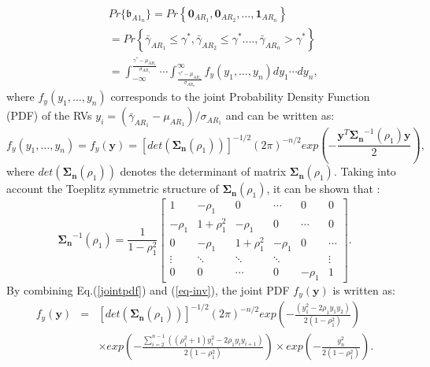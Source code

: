 \documentclass[12pt,draftcls, onecolumn]{IEEEtran}
\begin{document}
\begingroup
\begin{eqnarray}
&&Pr\{\mathfrak{b}_{A1_n}\} = Pr\left\{\boldsymbol{0}_{AR_1},\boldsymbol{0}_{AR_2},...,\boldsymbol{1}_{AR_n}\right\}\nonumber\\
&&=Pr\left\{\bar{\gamma}_{{AR_1}}\leq \gamma^*,\bar{\gamma}_{{AR_2}}\leq \gamma^*....,\bar{\gamma}_{{AR_n}}> \gamma^*\right\}\nonumber\\
&&=  \int^{\frac{\gamma^*-\mu_{AR_1}}{\sigma_{AR_1}}}_{-\infty}\cdots\int^{\infty}_{\frac{\gamma^*-\mu_{AR_n}}{\sigma_{AR_n}}} f_y\left(y_1, \ldots, y_n\right) dy_1\cdots dy_n,\label{eq:exp-int}
\end{eqnarray}
\endgroup
where $f_y\left(y_1, \ldots, y_n\right)$ corresponds to the joint Probability Density Function (PDF) of the RVs $y_i = \left(\bar{\gamma}_{{AR_1}} -\mu_{AR_1}\right)/ \sigma_{AR_1}$ and can be written as:
\begin{equation}
f_y\left(y_1, \ldots, y_n\right) = f_y\left(\mathbf{y}\right) = [det\left(\mathbf{\Sigma_n}\left(\rho_1\right)\right)]^{-1/2}\left(2\pi\right)^{-n/2}exp\left(-\frac{\mathbf{y}^T\mathbf{\Sigma_n}^{-1}\left(\rho_1\right)\mathbf{y}}{2}\right),\label{jointpdf}
\end{equation}
where $det\left(\mathbf{\Sigma_n}\left(\rho_1\right)\right)$ denotes the determinant of matrix $\mathbf{\Sigma_n}\left(\rho_1\right)$. Taking into account the Toeplitz symmetric structure of $\mathbf{\Sigma_n}\left(\rho_1\right)$, it can be shown that \cite{toeplitz}:
\begin{equation}
\mathbf{\Sigma_n}^{-1}\left(\rho_1\right) = \frac{1}{1-\rho_1^2}\left[\begin{array}{cccccc}
1&-\rho_1&0&\cdots&0&0\\
-\rho_1&1+\rho_1^2&-\rho_1&0&\cdots&0\\
0&-\rho_1&1+\rho^2_1&-\rho_1&0&\cdots\\
\vdots&\ddots&\ddots&\ddots&&\vdots\\
0&0&\cdots&0&-\rho_1&1
\end{array}\right].\label{eq-inv}
\end{equation}
By combining Eq.(\ref{jointpdf}) and (\ref{eq-inv}), the joint PDF $f_y\left(\mathbf{y}\right)$ is written as:
\begingroup
\begin{eqnarray}
f_y\left(\textbf{y}\right) &=& [det\left(\mathbf{\Sigma_n}\left(\rho_1\right)\right)]^{-1/2}\left(2\pi\right)^{-n/2}exp\left(-\frac{\left(y^2_1-2\rho_1 y_1y_2\right)}{2\left(1-\rho_1^2\right)}\right)\nonumber\\
&&\times exp\left(-\frac{ \sum^{n-1}_{i=2} \left(\left(\rho^2_1+1\right)y^2_i-2\rho_1 y_iy_{i+1}\right)}{2\left(1-\rho^2_1\right)}\right)\times exp\left(-\frac{ y^2_n}{2\left(1-\rho^2_1\right)}\right).\label{jointpdf2}
\end{eqnarray}
\end{document}
